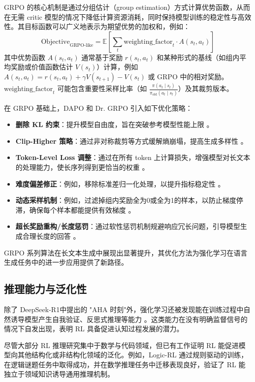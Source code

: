\documentclass{article}
\newcommand{\deepseekr}{DeepSeek-R1}
\newcommand{\deepseekr}{DeepSeek-R1}
\begin{document}
GRPO 的核心机制是通过分组估计（group estimation）方式计算优势函数，从而在无需 critic 模型的情况下降低计算资源消耗，同时保持模型训练的稳定性与高效性。其目标函数可以广义地表示为期望优势的加权和，例如：
\begin{equation}
\text{Objective}_{\text{GRPO-like}} = \mathbb{E} \left[ \sum_{t} \text{weighting_factor}_t \cdot A(s_t, a_t) \right]
\end{equation}
其中优势函数 $A(s_t, a_t)$ 通常基于奖励 $r(s_t, a_t)$ 和某种形式的基线（如组内平均奖励或价值函数估计 $V(s_t)$）计算，例如 $A(s_t, a_t) = r(s_t, a_t) + \gamma V(s_{t+1}) - V(s_t)$ 或 GRPO 中的相对奖励。$\text{weighting_factor}_t$ 可能包含重要性采样比率（如 $\frac{\pi(a_t \mid s_t)}{\pi_{\text{old}}(a_t \mid s_t)}$）及其裁剪版本。

在 GRPO 基础上，DAPO 和 Dr. GRPO 引入如下优化策略：
\begin{itemize}
    \item \textbf{删除 KL 约束}：提升模型自由度，旨在突破参考模型性能上限 \cite{yu2025dapo}。
    \item \textbf{Clip-Higher 策略}：通过非对称裁剪等方式缓解熵崩塌，提高生成多样性 \cite{yu2025dapo}。
    \item \textbf{Token-Level Loss 调整}：通过在所有 token 上计算损失，增强模型对长文本的处理能力，使长序列得到更恰当的权重 \cite{yu2025dapo}。
    \item \textbf{难度偏差修正}：例如，移除标准差归一化处理，以提升指标稳定性 \cite{liu2025understanding}。
    \item \textbf{动态采样机制}：例如，过滤掉组内奖励全为0或全为1的样本，以防止梯度停滞，确保每个样本都能提供有效梯度 \cite{yu2025dapo}。
    \item \textbf{超长奖励重构/长度惩罚}：通过软性惩罚机制规避响应冗长问题，引导模型生成合理长度的回答 \cite{yu2025dapo}。
\end{itemize}
GRPO 系列算法在长文本生成中展现出显著提升，其优化方法为强化学习在语言生成任务中的进一步应用提供了新路径。

\subsection{推理能力与泛化性}

除了 \deepseekr 中提出的 "AHA 时刻"外，强化学习还被发现能在训练过程中自然诱导模型产生自我验证、反思式推理等能力 \cite{el2025competitive}。这类能力在没有明确监督信号的情况下自发出现，表明 RL 具备促进认知过程发展的潜力。

尽管大部分 RL 推理研究集中于数学与代码领域，但已有工作证明 RL 能促进模型向其他结构化或非结构化领域的泛化。例如，Logic-RL\cite{xie2025logic} 通过规则驱动的训练，在逻辑谜题任务中取得成功，并在数学推理任务中迁移表现良好，验证了 RL 能独立于领域知识诱导通用推理机制。
\end{document}
